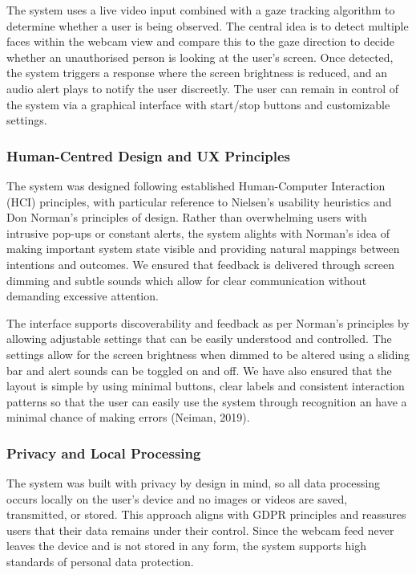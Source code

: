 \documentclass[12pt]{article}
\theoremstyle{plain}
\theoremstyle{definition}
\begin{document}
The system uses a live video input combined with a gaze tracking algorithm to determine whether a user is being observed. The central idea is to detect multiple faces within the webcam view and compare this to the gaze direction to decide whether an unauthorised person is looking at the user’s screen. Once detected, the system triggers a response where the screen brightness is reduced, and an audio alert plays to notify the user discreetly. The user can remain in control of the system via a graphical interface with start/stop buttons and customizable settings.

\subsubsection{Human-Centred Design and UX Principles}

The system was designed following established Human-Computer Interaction (HCI) principles, with particular reference to Nielsen’s usability heuristics and Don Norman’s principles of design. Rather than overwhelming users with intrusive pop-ups or constant alerts, the system alights with Norman’s idea of making important system state visible and providing natural mappings between intentions and outcomes. We ensured that feedback is delivered through screen dimming and subtle sounds which allow for clear communication without demanding excessive attention.

The interface supports discoverability and feedback as per Norman’s principles by allowing adjustable settings that can be easily understood and controlled. The settings allow for the screen brightness when dimmed to be altered using a sliding bar and alert sounds can be toggled on and off. We have also ensured that the layout is simple by using minimal buttons, clear labels and consistent interaction patterns so that the user can easily use the system through recognition an have a minimal chance of making errors (Neiman, 2019).

\subsubsection{Privacy and Local Processing}

The system was built with privacy by design in mind, so all data processing occurs locally on the user’s device and no images or videos are saved, transmitted, or stored. This approach aligns with GDPR principles and reassures users that their data remains under their control. Since the webcam feed never leaves the device and is not stored in any form, the system supports high standards of personal data protection.
\end{document}

